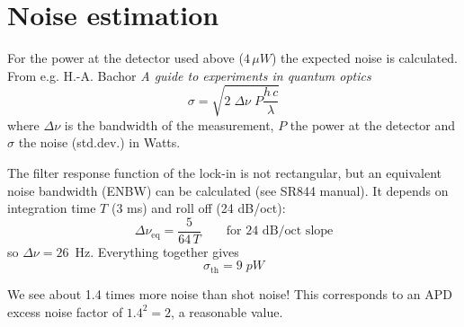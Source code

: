 \documentclass[12pt,a4paper]{article}
\begin{document}
\section{Noise estimation}

For the power at the detector used above ($ 4 \, \mu W$) the expected noise is calculated.
From e.g. H.-A. Bachor \emph{A guide to experiments in quantum optics} 
\[ 
  \sigma = \sqrt{ 2 \; \Delta \nu \; P \frac{h \, c}{\lambda}} \]
where $\Delta \nu$ is the bandwidth of the measurement, $P$ the power at the detector and $\sigma$ the noise (std.dev.) in Watts.

The filter response function of the lock-in is not rectangular, but an equivalent noise bandwidth (ENBW) can be calculated (see SR844 manual). It depends on integration time $T$ (3 ms) and roll off (24 dB/oct):
\[
  \Delta \nu_{\text{eq}} = \frac{5}{64 \, T} \qquad \text{for 24 dB/oct slope} \]
 so $\Delta \nu = 26$~Hz.
  Everything together gives
 \[ 
 \sigma_{\text{th}} = 9 \; pW \]

We see about 1.4 times more noise than shot noise! This corresponds to an APD excess  noise factor of $1.4^2 = 2$, a reasonable value.
 
\end{document}
